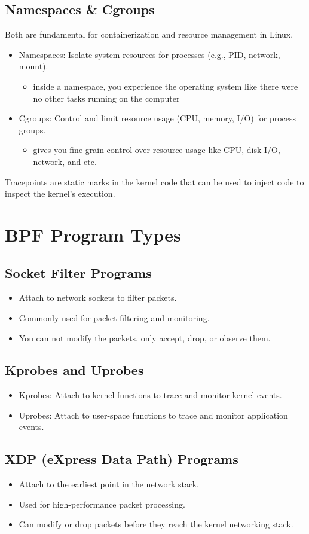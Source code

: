 \documentclass[a4paper,12pt]{article}
\begin{document}
\subsection{Namespaces \& Cgroups}
Both are fundamental for containerization and resource management in Linux. 
\begin{itemize}
    \item Namespaces: Isolate system resources for processes (e.g., PID, network, mount).
    \begin{itemize}
        \item inside a namespace, you experience the operating system like there were no other tasks running on the computer
    \end{itemize}
    \item Cgroups: Control and limit resource usage (CPU, memory, I/O) for process groups.
    \begin{itemize}
        \item gives you fine grain control over resource usage like CPU, disk I/O, network, and etc.
    \end{itemize}
\end{itemize}

Tracepoints are static marks in the kernel code that can be used to inject code to inspect the kernel's execution.

\section{BPF Program Types}

\subsection{Socket Filter Programs}
\begin{itemize}
    \item Attach to network sockets to filter packets.
    \item Commonly used for packet filtering and monitoring.
    \item You can not modify the packets, only accept, drop, or observe them.
\end{itemize}

\subsection{Kprobes and Uprobes}
\begin{itemize}
    \item Kprobes: Attach to kernel functions to trace and monitor kernel events.
    \item Uprobes: Attach to user-space functions to trace and monitor application events.
\end{itemize}

\subsection{XDP (eXpress Data Path) Programs}
\begin{itemize}
    \item Attach to the earliest point in the network stack.
    \item Used for high-performance packet processing.
    \item Can modify or drop packets before they reach the kernel networking stack.
\end{itemize}
\end{document}
